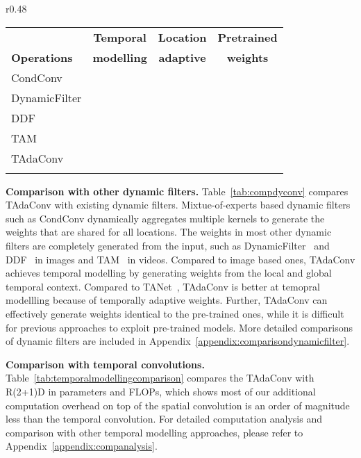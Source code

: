 \documentclass{article} \usepackage{iclr2022_conference,times}
\newcommand{\cmark}{\color{forestgreen}\ding{51}}\newcommand{\xmark}{\color{red}\ding{55}}\usepackage{pifont}
\newcommand{\tablestyle}[2]{\setlength{\tabcolsep}{#1}\renewcommand{\arraystretch}{#2}\centering\small}
\begin{document}
\begin{wraptable}[8]{r}{0.48\textwidth}
\tablestyle{3pt}{1.0}
\vspace{-1.5em}
\caption{{Comparison with other dynamic filters.}
}
\vspace{-1em}
\centering
\begin{tabular}{lccc}
\shline
~ &  \textbf{Temporal} &  \textbf{Location} & \textbf{Pretrained}\\
\textbf{Operations} &  \textbf{modelling} &  \textbf{adaptive} & \textbf{weights}\\
\hline
 CondConv & \xmark & \xmark & \xmark \\
 DynamicFilter & \xmark & \xmark & \xmark \\
 DDF & \xmark & \cmark & \xmark \\
 TAM & \cmark & \xmark & \xmark \\
 TAdaConv & \cmark & \cmark & \cmark \\
\shline
\end{tabular}
\label{tab:compdyconv}
\end{wraptable}
\textbf{Comparison with other dynamic filters.} Table~\ref{tab:compdyconv} compares TAdaConv with existing dynamic filters. 
Mixtue-of-experts based dynamic filters such as CondConv dynamically aggregates multiple kernels to generate the weights that are shared for all locations.
The weights in most other dynamic filters are completely generated from the input, such as DynamicFilter~\citep{dynamicfilter} and DDF~\citep{ddf} in images and TAM~\citep{tam} in videos.
Compared to image based ones, TAdaConv achieves temporal modelling by generating weights from the local and global temporal context. Compared to TANet~\citep{tam}, TAdaConv is better at temopral modellling because of temporally adaptive weights.
Further, TAdaConv can effectively generate weights identical to the pre-trained ones, while it is difficult for previous approaches to exploit pre-trained models.
More detailed comparisons of dynamic filters are included in Appendix~\ref{appendix:comparisondynamicfilter}.

\textbf{Comparison with temporal convolutions.} Table~\ref{tab:temporalmodellingcomparison} compares the TAdaConv with R(2+1)D in parameters and FLOPs, which shows most of our additional computation overhead on top of the spatial convolution is an order of magnitude less than the temporal convolution. For detailed computation analysis and comparison with other temporal modelling approaches, please refer to Appendix~\ref{appendix:companalysis}.
\end{document}
